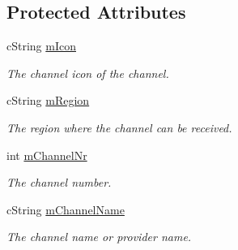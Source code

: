 \subsection*{Protected Attributes}
\begin{CompactItemize}
\item 
\hypertarget{classcUPnPClassVideoBroadcast_24aa59d4c90d705f651cddf4ed90ad73}{
cString \hyperlink{classcUPnPClassVideoBroadcast_24aa59d4c90d705f651cddf4ed90ad73}{mIcon}}
\label{classcUPnPClassVideoBroadcast_24aa59d4c90d705f651cddf4ed90ad73}

\begin{CompactList}\small\item\em The channel icon of the channel. \item\end{CompactList}\item 
\hypertarget{classcUPnPClassVideoBroadcast_9a9420e700fd45afd24beba8ae261909}{
cString \hyperlink{classcUPnPClassVideoBroadcast_9a9420e700fd45afd24beba8ae261909}{mRegion}}
\label{classcUPnPClassVideoBroadcast_9a9420e700fd45afd24beba8ae261909}

\begin{CompactList}\small\item\em The region where the channel can be received. \item\end{CompactList}\item 
\hypertarget{classcUPnPClassVideoBroadcast_8ad5b61bf9e88e1b30a132ca72b0d905}{
int \hyperlink{classcUPnPClassVideoBroadcast_8ad5b61bf9e88e1b30a132ca72b0d905}{mChannelNr}}
\label{classcUPnPClassVideoBroadcast_8ad5b61bf9e88e1b30a132ca72b0d905}

\begin{CompactList}\small\item\em The channel number. \item\end{CompactList}\item 
\hypertarget{classcUPnPClassVideoBroadcast_aae072a7d7a21b699561a62700971c26}{
cString \hyperlink{classcUPnPClassVideoBroadcast_aae072a7d7a21b699561a62700971c26}{mChannelName}}
\label{classcUPnPClassVideoBroadcast_aae072a7d7a21b699561a62700971c26}

\begin{CompactList}\small\item\em The channel name or provider name. \item\end{CompactList}\end{CompactItemize}
